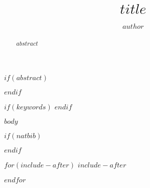 \documentclass[times]{simauth}
\begin{document}

\title{$title$}
\author{$author$}
\address{$for(address)$ $address.address$\\$endfor$}

$if(abstract)$
\begin{abstract}
$abstract$
\end{abstract}
$endif$

$if(keywords)$
$endif$

\maketitle

$body$

$if(natbib)$


$endif$

$for(include-after)$
$include-after$

$endfor$
\end{document}
